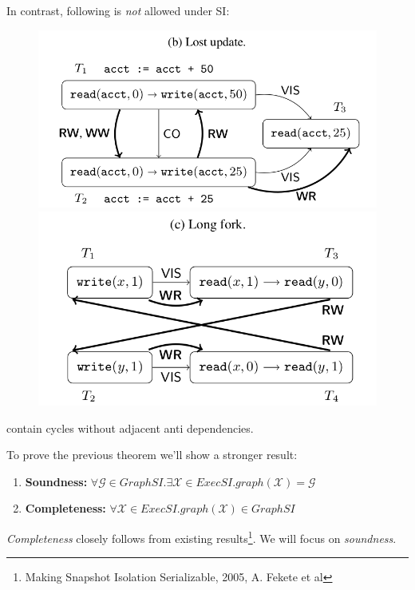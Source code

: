 \documentclass{beamer}
\begin{document}
\begin{frame}
	In contrast, following is \emph{not} allowed under SI:
	\begin{figure}
		\includegraphics[scale=0.2]{fig2b}
		\includegraphics[scale=0.2]{fig2c}
	\end{figure}
	contain cycles without adjacent anti dependencies.
\end{frame}

\begin{frame}
	To prove the previous theorem we'll show a stronger result:
	\begin{theorem}
		\begin{enumerate}
			\item \textbf{Soundness:} $ \forall \mathcal{G} \in GraphSI. \exists \mathcal{X} \in ExecSI. graph(\mathcal{X}) = \mathcal{G} $ 
			\item \textbf{Completeness:} $ \forall \mathcal{X} \in ExecSI. graph(\mathcal{X}) \in GraphSI$
		\end{enumerate}
	\end{theorem}
	\textit{Completeness} closely follows from existing results\footnote{Making Snapshot Isolation Serializable, 2005, A. Fekete et al}. We will focus on \textit{soundness}.
	
\end{frame}
\end{document}
